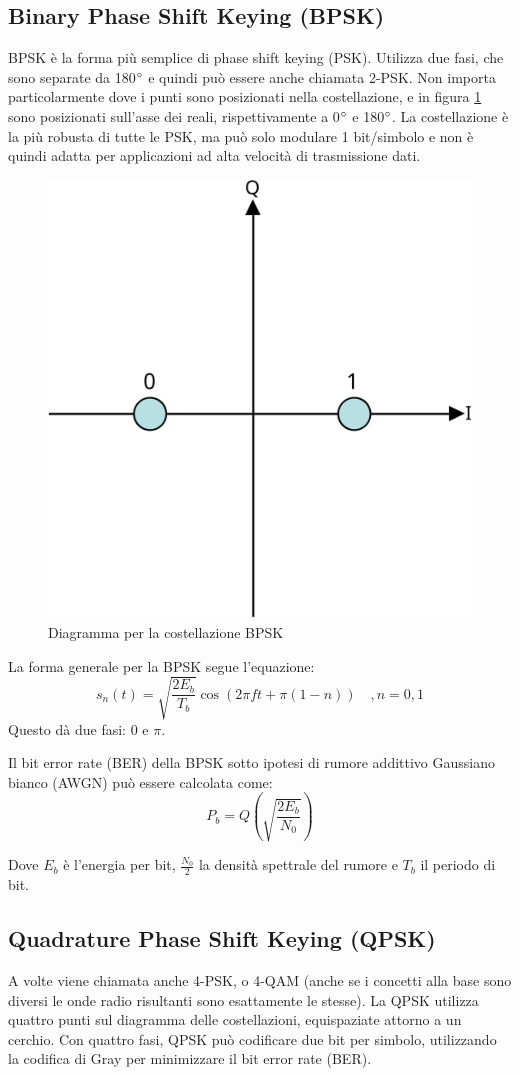 \subsection{Binary Phase Shift Keying (BPSK)}
\ac{BPSK} è la forma più semplice di phase shift keying (\ac{PSK}).
Utilizza due fasi, che sono separate da 180$\degree$ e quindi può essere anche chiamata 2-\ac{PSK}.
Non importa particolarmente dove i punti sono posizionati nella costellazione, e in figura \ref{fig:bpsk-diagram} sono posizionati sull'asse dei reali, rispettivamente a 0$\degree$ e 180$\degree$.
La costellazione è la più robusta di tutte le \ac{PSK}, ma può solo modulare 1 bit/simbolo e non è quindi adatta per applicazioni ad alta velocità di trasmissione dati.

\begin{figure}[htbp]
  \centering
  \includegraphics[width=0.4\linewidth]{./res/img/bpsk_diagram.png}
  \caption{Diagramma per la costellazione BPSK}
  \label{fig:bpsk-diagram}
\end{figure}

La forma generale per la \ac{BPSK} segue l'equazione:
$$s_n(t) = \sqrt{\frac{2E_b}{T_b}} \cos(2\pi f t + \pi(1-n)) \quad , n = 0,1 $$
Questo dà due fasi: 0 e $\pi$.

Il bit error rate (\ac{BER}) della \ac{BPSK} sotto ipotesi di rumore addittivo Gaussiano bianco (\acs{AWGN}) può essere calcolata come:
$$P_b = Q(\sqrt{\frac{2 E_b}{N_0}})$$

Dove $E_b$ è l'energia per bit, $\frac{N_0}{2}$ la densità spettrale del rumore e $T_b$ il periodo di bit.

\subsection{Quadrature Phase Shift Keying (QPSK)}
A volte viene chiamata anche 4-\ac{PSK}, o 4-\ac{QAM} (anche se i concetti alla base sono diversi le onde radio risultanti sono esattamente le stesse).
La \ac{QPSK} utilizza quattro punti sul diagramma delle costellazioni, equispaziate attorno a un cerchio.
Con quattro fasi, \ac{QPSK} può codificare due bit per simbolo, utilizzando la codifica di Gray per minimizzare il bit error rate (\ac{BER}).

